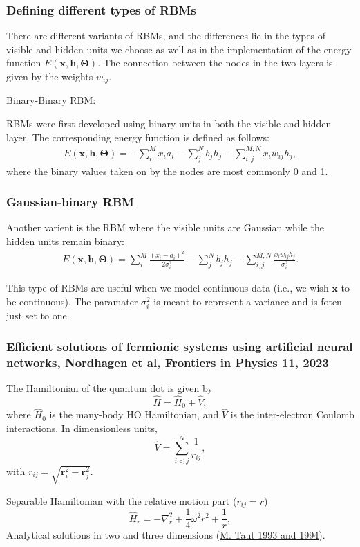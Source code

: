 \documentclass{beamer}
\begin{document}
\begin{frame}
\frametitle{Defining different types of RBMs}

There are different variants of RBMs, and the differences lie in the types of visible and hidden units we choose as well as in the implementation of the energy function $E(\bm{x},\bm{h},\bm{\Theta})$. The connection between the nodes in the two layers is given by the weights $w_{ij}$. 

\begin{block}{Binary-Binary RBM: }

RBMs were first developed using binary units in both the visible and hidden layer. The corresponding energy function is defined as follows:
\begin{align*}
	E(\bm{x}, \bm{h},\bm{\Theta}) = - \sum_i^M x_i a_i- \sum_j^N b_j h_j - \sum_{i,j}^{M,N} x_i w_{ij} h_j,
\end{align*}
where the binary values taken on by the nodes are most commonly 0 and 1.
\end{block}
\end{frame}

\begin{frame}
\frametitle{Gaussian-binary RBM}

Another varient is the RBM where the visible units are Gaussian while the hidden units remain binary:
\begin{align*}
	E(\bm{x}, \bm{h},\bm{\Theta}) = \sum_i^M \frac{(x_i - a_i)^2}{2\sigma_i^2} - \sum_j^N b_j h_j - \sum_{i,j}^{M,N} \frac{x_i w_{ij} h_j}{\sigma_i^2}. 
\end{align*}

This type of RBMs are useful when we model continuous data (i.e., we wish $\bm{x}$ to be continuous). The paramater $\sigma_i^2$ is meant to represent a variance and is foten just set to one.
\end{frame}

\begin{frame}
\frametitle{\href{{https://doi.org/10.3389/fphy.2023.1061580}}{Efficient solutions of fermionic systems using artificial neural networks, Nordhagen et al, Frontiers in Physics 11, 2023}}

The Hamiltonian of the quantum dot is given by
\[ \hat{H} = \hat{H}_0 + \hat{V}, 
\]
where $\hat{H}_0$ is the many-body HO Hamiltonian, and $\hat{V}$ is the
inter-electron Coulomb interactions. In dimensionless units,
\[ \hat{V}= \sum_{i < j}^N \frac{1}{r_{ij}},
\]
with $r_{ij}=\sqrt{\mathbf{r}_i^2 - \mathbf{r}_j^2}$.

Separable Hamiltonian with the relative motion part ($r_{ij}=r$)
\[ 
\hat{H}_r=-\nabla^2_r + \frac{1}{4}\omega^2r^2+ \frac{1}{r},
\]
Analytical solutions in two and three dimensions (\href{{https://journals.aps.org/pra/abstract/10.1103/PhysRevA.48.3561}}{M. Taut 1993 and 1994}).
\end{frame}
\end{document}
